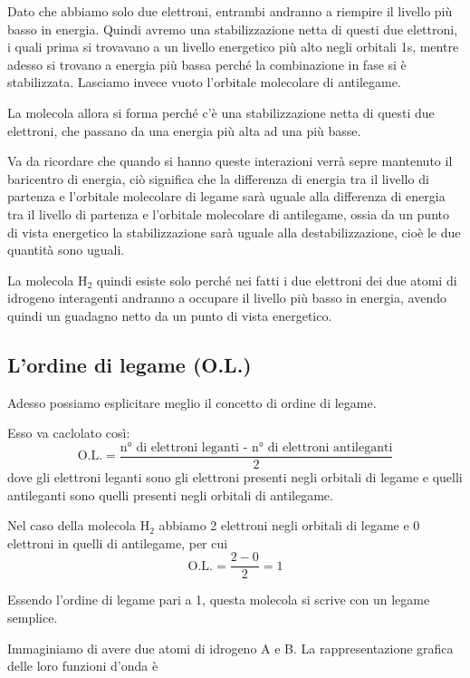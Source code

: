 \vspace{0.2cm}Dato che abbiamo solo due elettroni, entrambi andranno a riempire il livello più basso in energia. Quindi avremo una stabilizzazione netta di questi due elettroni, i quali prima si trovavano a un livello energetico più alto negli orbitali 1s, mentre adesso si trovano a energia più bassa perché la combinazione in fase si è stabilizzata. Lasciamo invece vuoto l'orbitale molecolare di antilegame.

La molecola allora si forma perché c'è una stabilizzazione netta di questi due elettroni, che passano da una energia più alta ad una più basse.

Va da ricordare che quando si hanno queste interazioni verrà sepre mantenuto il baricentro di energia, ciò significa che la differenza di energia tra il livello di partenza e l'orbitale molecolare di legame sarà uguale alla differenza di energia tra il livello di partenza e l'orbitale molecolare di antilegame, ossia da un punto di vista energetico la stabilizzazione sarà uguale alla destabilizzazione, cioè le due quantità sono uguali.

La molecola H$_2$ quindi esiste solo perché nei fatti i due elettroni dei due atomi di idrogeno interagenti andranno a occupare il livello più basso in energia, avendo quindi un guadagno netto da un punto di vista energetico.

\subsection{L'ordine di legame (O.L.)}
Adesso possiamo esplicitare meglio il concetto di ordine di legame.

Esso va caclolato così:
$$\text{O.L.}=\frac{\text{n° di elettroni leganti - n° di elettroni antileganti}}{2}$$
dove gli elettroni leganti sono gli elettroni presenti negli orbitali di legame e quelli antileganti sono quelli presenti negli orbitali di antilegame.

Nel caso della molecola H$_2$ abbiamo 2 elettroni negli orbitali di legame e 0 elettroni in quelli di antilegame, per cui
$$\text{O.L.}=\frac{2-0}{2}=1$$

Essendo l'ordine di legame pari a 1, questa molecola si scrive con un legame semplice.

\vspace{0.2cm}Immaginiamo di avere due atomi di idrogeno A e B. La rappresentazione grafica delle loro funzioni d'onda è

